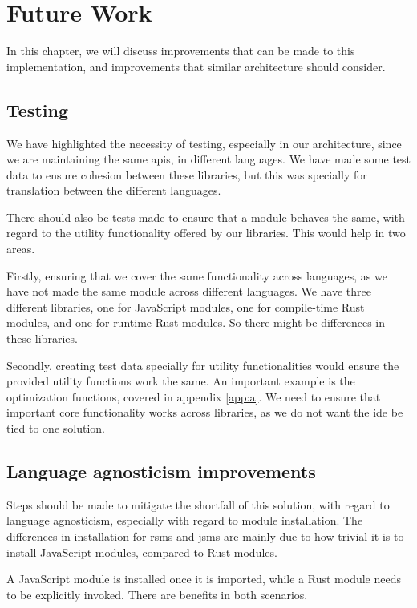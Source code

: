 \chapter{Future Work} \label{cha:future}

In this chapter, we will discuss improvements that can be made to this
implementation, and improvements that similar architecture should
consider.


\section{Testing}

We have highlighted the necessity of testing, especially in our architecture,
since we are maintaining the same \gls*{api}s, in different languages. We have
made some test data to ensure cohesion between these libraries, but this was
specially for translation between the different languages.

There should also be tests made to ensure that a module behaves the same, with
regard to the utility functionality offered by our libraries. This would help
in two areas.

Firstly, ensuring that we cover the same functionality across languages, as we
have not made the same module across different languages. We have three
different libraries, one for JavaScript modules, one for compile-time Rust
modules, and one for runtime Rust modules. So there might be differences in
these libraries.

Secondly, creating test data specially for utility functionalities would ensure
the provided utility functions work the same. An important example is the
optimization functions, covered in appendix \ref{app:a}. We need to ensure that
important core functionality works across libraries, as we do not want the
\gls*{ide} be tied to one solution.


\section{Language agnosticism improvements}

Steps should be made to mitigate the shortfall of this solution, with regard to
language agnosticism, especially with regard to module installation. The
differences in installation for \gls*{rsms} and \gls*{jsms} are mainly due to
how trivial it is to install JavaScript modules, compared to Rust modules.

A JavaScript module is installed once it is imported, while a Rust module needs
to be explicitly invoked. There are benefits in both scenarios.

